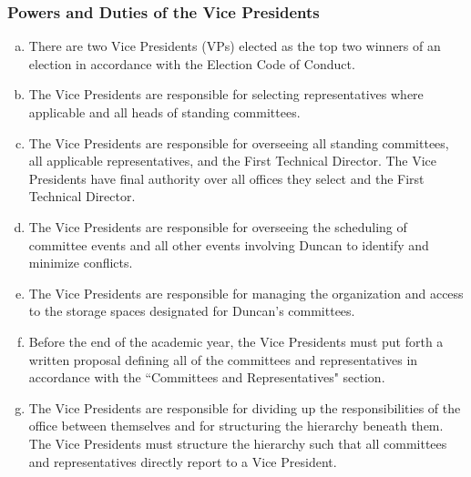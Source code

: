 \documentclass[USletter,12pt]{article}
\begin{document}
\subsubsection{Powers and Duties of the Vice Presidents}
\begin{enumerate}[(a)]
\item There are two Vice Presidents (VPs) elected as the top two winners of an election in accordance with the Election Code of Conduct.
\item The Vice Presidents are responsible for selecting representatives where applicable and all heads of standing committees.
\item The Vice Presidents are responsible for overseeing all standing committees, all applicable representatives, and the First Technical Director.  The Vice Presidents have final authority over all offices they select and the First Technical Director.
\item The Vice Presidents are responsible for overseeing the scheduling of committee events and all other events involving Duncan to identify and minimize conflicts.
\item The Vice Presidents are responsible for managing the organization and access to the storage spaces designated for Duncan's committees.
\item Before the end of the academic year, the Vice Presidents must put forth a written proposal defining all of the committees and representatives in accordance with the ``Committees and Representatives" section.
\item The Vice Presidents are responsible for dividing up the responsibilities of the office between themselves and for structuring the hierarchy beneath them.  The Vice Presidents must structure the hierarchy such that all committees and representatives directly report to a Vice President.
\end{enumerate}
\end{document}
